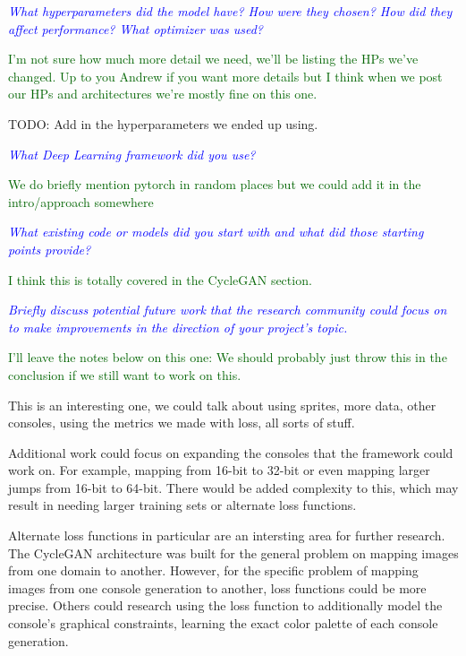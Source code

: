 \documentclass[10pt,twocolumn,letterpaper]{article}
\begin{document}
\textit{\textcolor{blue}{What hyperparameters did the model have? How were they chosen? How did they affect performance? What optimizer was used?}}

\textcolor{darkgreen}{I'm not sure how much more detail we need, we'll be listing the HPs we've changed. Up to you Andrew if you want more details but I think when we post our HPs and architectures we're mostly fine on this one.}

TODO: Add in the hyperparameters we ended up using.

\textit{\textcolor{blue}{What Deep Learning framework did you use?}}

\textcolor{darkgreen}{We do briefly mention pytorch in random places but we could add it in the intro/approach somewhere}

\textit{\textcolor{blue}{What existing code or models did you start with and what did those starting points provide?}}

\textcolor{darkgreen}{I think this is totally covered in the CycleGAN section.}

\textit{\textcolor{blue}{Briefly discuss potential future work that the research community could focus on to make improvements in the direction of your project's topic.}}

\textcolor{darkgreen}{I'll leave the notes below on this one: We should probably just throw this in the conclusion if we still want to work on this.}

This is an interesting one, we could talk about using sprites, more data, other consoles, using the metrics we made with loss, all sorts of stuff.

Additional work could focus on expanding the consoles that the framework could work on. For example, mapping from 16-bit to 32-bit or even mapping larger jumps from 16-bit to 64-bit. There would be added complexity to this, which may result in needing larger training sets or alternate loss functions.

Alternate loss functions in particular are an intersting area for further research. The CycleGAN architecture was built for the general problem on mapping images from one domain to another. However, for the specific problem of mapping images from one console generation to another, loss functions could be more precise. Others could research using the loss function to additionally model the console's graphical constraints, learning the exact color palette of each console generation.

\end{document}
